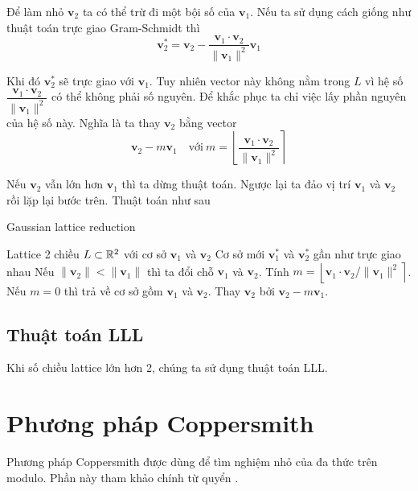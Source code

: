 Để làm nhỏ $\bm{v}_2$ ta có thể trừ đi một bội số của $\bm{v}_1$. Nếu ta sử dụng cách giống như thuật toán trực giao Gram-Schmidt thì
\begin{equation*}
    \bm{v}_2^* = \bm{v}_2 - \dfrac{\bm{v}_1 \cdot \bm{v}_2}{\lVert \bm{v}_1 \rVert^2} \bm{v}_1
\end{equation*}

Khi đó $\bm{v}_2^*$ sẽ trực giao với $\bm{v}_1$. Tuy nhiên vector này không nằm trong $L$ vì hệ số $\dfrac{\bm{v}_1 \cdot \bm{v}_2}{\lVert \bm{v}_1 \rVert^2}$ có thể không phải số nguyên. Để khắc phục ta chỉ việc lấy phần nguyên của hệ số này. Nghĩa là ta thay $\bm{v}_2$ bằng vector
\begin{equation*}
    \bm{v}_2 - m \bm{v}_1 \quad \text{với}\ m = \left\lfloor \dfrac{\bm{v}_1 \cdot \bm{v}_2}{\lVert \bm{v}_1 \rVert^2} \right\rceil
\end{equation*}

Nếu $\bm{v}_2$ vẫn lớn hơn $\bm{v}_1$ thì ta dừng thuật toán. Ngược lại ta đảo vị trí $\bm{v}_1$ và $\bm{v}_2$ rồi lặp lại bước trên. Thuật toán như sau

\begin{algorithm}[htb]
    \caption{Gaussian lattice reduction}
    \begin{algorithmic}  
        \Require Lattice 2 chiều $L \subset \mathbb{R}^2$ với cơ sở $\bm{v}_1$ và $\bm{v}_2$
        \Ensure Cơ sở mới $\bm{v}_1^*$ và $\bm{v}_2^*$ gần như trực giao nhau
        \State Nếu $\lVert \bm{v}_2 \rVert < \lVert \bm{v}_1 \rVert$ thì ta đổi chỗ $\bm{v}_1$ và $\bm{v}_2$.
        \State Tính $m = \left\lfloor \bm{v}_1 \cdot \bm{v}_2 / \lVert \bm{v}_1 \rVert^2 \right\rceil$.
        \State Nếu $m = 0$ thì trả về cơ sở gồm $\bm{v}_1$ và $\bm{v}_2$.
        \State Thay $\bm{v}_2$ bởi $\bm{v}_2 - m \bm{v}_1$.
    \end{algorithmic}
\end{algorithm}

\subsection*{Thuật toán LLL}

Khi số chiều lattice lớn hơn 2, chúng ta sử dụng thuật toán LLL.

\section{Phương pháp Coppersmith}

Phương pháp Coppersmith được dùng để tìm nghiệm nhỏ của đa thức trên modulo. Phần này tham khảo chính từ quyển \cite{Galbraith}.

